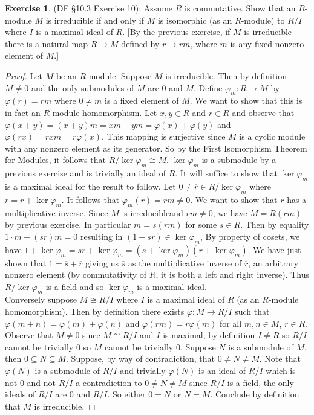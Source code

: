 \documentclass[8pt]{amsart}
\theoremstyle{plain}%
\theoremstyle{definition}
\newtheorem*{exercise}{Exercise}%
\theoremstyle{remark}
\numberwithin{equation}{section}
\begin{document}
\begin{exercise}
(DF \S 10.3 Exercise 10): Assume $R$ is commutative. Show that an $R$-module $M$ is irreducible if and only if $M$ is isomorphic (as an $R$-module) to $R/I$ where $I$ is a maximal ideal of $R$. [By the previous exercise, if $M$ is irreducible there is a natural map $R \to M$ defined by $r \mapsto rm$, where $m$ is any fixed nonzero element of $M$.]
	\begin{proof}
		Let $M$ be an $R$-module. Suppose $M$ is irreducible. Then by definition $M \neq 0$ and the only submodules of $M$ are $0$ and $M$. Define $\varphi_m : R \to M$ by $\varphi(r) = rm$ where $0 \neq m$ is a fixed element of $M$. We want to show that this is in fact an $R$-module homomorphism. Let $x, y \in R$ and $r \in R$ and observe that $\varphi(x + y) = (x + y)m = xm + ym = \varphi(x) + \varphi(y)$ and $\varphi(rx) = rxm = r\varphi(x)$. This mapping is surjective since $M$ is a cyclic module with any nonzero element as its generator. So by the First Isomorphism Theorem for Modules, it follows that $R/\ker \varphi_m \cong M$. $\ker \varphi_m$ is a submodule by a previous exercise and is trivially an ideal of $R$. It will suffice to show that $\ker \varphi_m$ is a maximal ideal for the result to follow. Let $0 \neq \overline r \in R/\ker \varphi_m$ where $\overline r = r + \ker \varphi_m$. It follows that $\varphi_m(r) = rm \neq 0$. We want to show that $\overline r$ has a multiplicative inverse. Since $M$ is irreducibleand $rm \neq 0$, we have $M = R(rm)$ by previous exercise. In particular $m = s(rm)$ for some $s \in R$. Then by equality $1\cdot m - (sr)m = 0$ resulting in $(1 - sr) \in \ker \varphi_m$, By property of cosets, we have $1 + \ker \varphi_m = sr + \ker \varphi_m = (s + \ker \varphi_m)(r + \ker \varphi_m)$. We have just shown that $\overline 1 = \overline s + \overline r$ giving us $\overline s$ as the multiplicative inverse of $\overline r$, an arbitrary nonzero element (by commutativity of $R$, it is both a left and right inverse). Thus $R/\ker \varphi_m$ is a field and so $\ker \varphi_m$ is a maximal ideal.\\

		Conversely suppose $M \cong R/I$ where $I$ is a maximal ideal of $R$ (as an $R$-module homomorphism). Then by definition there exists $\varphi : M \to R/I$ such that $\varphi(m + n) = \varphi(m) + \varphi(n)$ and $\varphi(rm) = r \varphi(m)$ for all $m, n \in M$, $r \in R$. Observe that $M \neq 0$ since $M \cong R/I$ and $I$ is maximal, by definition $I \neq R$ so $R/I$ cannot be trivially 0 so $M$ cannot be trivially 0. Suppose $N$ is a submodule of $M$, then $0 \subseteq N \subseteq M$. Suppose, by way of contradiction, that $0 \neq N \neq M$. Note that $\varphi(N)$ is a submodule of $R/I$ and trivially $\varphi(N)$ is an ideal of $R/I$ which is not 0 and not $R/I$ a contradiction to $0 \neq N \neq M$ since $R/I$ is a field, the only ideals of $R/I$ are 0 and $R/I$. So either $0 = N$ or $N = M$. Conclude by definition that $M$ is irreducible.
	\end{proof}
\end{exercise}
\end{document}
